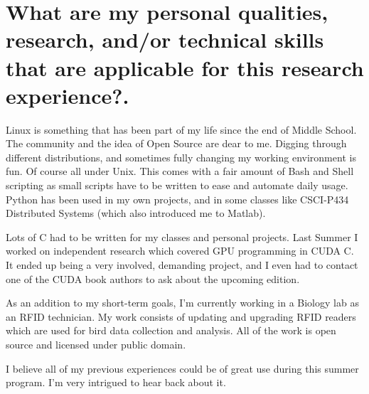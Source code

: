 \documentclass{article}
\begin{document}
\section{What are my personal qualities, research, and/or technical skills that are applicable for this research experience?.}
Linux is something that has been part of my life since the end of Middle School. The community and the idea of Open Source are dear to me. Digging through different distributions, and sometimes fully changing my working environment is fun. Of course all under Unix. This comes with a fair amount of Bash and Shell scripting as small scripts have to be written to ease and automate daily usage. Python has been used in my own projects, and in some classes like CSCI-P434 Distributed
Systems (which also introduced me to Matlab).\par
Lots of C had to be written for my classes and personal projects. Last Summer I worked on independent research which covered GPU programming in CUDA C. It ended up being a very involved, demanding project, and I even had to contact one of the CUDA book authors to ask about the upcoming edition.\par
As an addition to my short-term goals, I'm currently working in a Biology lab as an RFID technician. My work consists of updating and upgrading RFID readers which are used for bird data collection and analysis. All of the work is open source and licensed under public domain.\par
I believe all of my previous experiences could be of great use during this summer program. I'm very intrigued to hear back about it.
\end{document}
